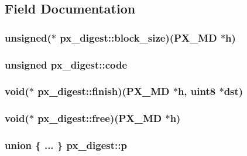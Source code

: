 \subsection{Field Documentation}
\hypertarget{structpx__digest_a137ed005ffea79a7fda88a5f8893ce45}{
\subsubsection[{block\-\_\-size}]{\setlength{\rightskip}{0pt plus 5cm}unsigned($\ast$ px\-\_\-digest\-::block\-\_\-size)({\bf P\-X\-\_\-\-M\-D} $\ast$h)}}\label{structpx__digest_a137ed005ffea79a7fda88a5f8893ce45}
\hypertarget{structpx__digest_a7760b436ae0edceac7daaa3ca7ee90dd}{
\subsubsection[{code}]{\setlength{\rightskip}{0pt plus 5cm}unsigned px\-\_\-digest\-::code}}\label{structpx__digest_a7760b436ae0edceac7daaa3ca7ee90dd}
\hypertarget{structpx__digest_ae89cdb9f137bf3be780ffc3f6614ec47}{
\subsubsection[{finish}]{\setlength{\rightskip}{0pt plus 5cm}void($\ast$ px\-\_\-digest\-::finish)({\bf P\-X\-\_\-\-M\-D} $\ast$h, {\bf uint8} $\ast$dst)}}\label{structpx__digest_ae89cdb9f137bf3be780ffc3f6614ec47}
\hypertarget{structpx__digest_aa2b2fff74a15b31bad4f14eacf22c107}{
\subsubsection[{free}]{\setlength{\rightskip}{0pt plus 5cm}void($\ast$ px\-\_\-digest\-::free)({\bf P\-X\-\_\-\-M\-D} $\ast$h)}}\label{structpx__digest_aa2b2fff74a15b31bad4f14eacf22c107}
\hypertarget{structpx__digest_a12dcd37566f38c4df0f8b2dafd26f6f7}{
\subsubsection[{p}]{\setlength{\rightskip}{0pt plus 5cm}union \{ ... \} 			 px\-\_\-digest\-::p}}\label{structpx__digest_a12dcd37566f38c4df0f8b2dafd26f6f7}
